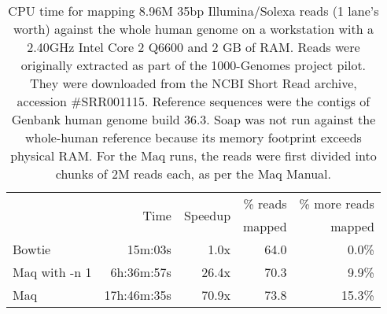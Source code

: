 \documentclass[letterpaper]{article}
\begin{document}
\begin{table}[tp]
\scriptsize
\begin{tabular}{lrrrr}\toprule
 & \multirow{2}{*}{Time} & \multirow{2}{*}{Speedup} & \% reads & \% more reads\\
 &                        &                           & mapped    & mapped        \\[3pt]
\toprule
Bowtie & 15m:03s & 1.0x & 64.0 & 0.0\% \\\midrule
Maq with -n 1 & 6h:36m:57s & 26.4x & 70.3 & 9.9\% \\\midrule
Maq & 17h:46m:35s & 70.9x & 73.8 & 15.3\% \\
\bottomrule
\end{tabular}
\caption{CPU time for mapping 8.96M 35bp Illumina/Solexa reads (1 lane's worth) against the whole human genome on a workstation with a 2.40GHz Intel Core 2 Q6600 and 2 GB of RAM. Reads were originally extracted as part of the 1000-Genomes project pilot. They were downloaded from the NCBI Short Read archive, accession #SRR001115. Reference sequences were the contigs of Genbank human genome build 36.3. Soap was not run against the whole-human reference because its memory footprint exceeds physical RAM. For the Maq runs, the reads were first divided into chunks of 2M reads each, as per the Maq Manual.}
\end{table}
\end{document}

